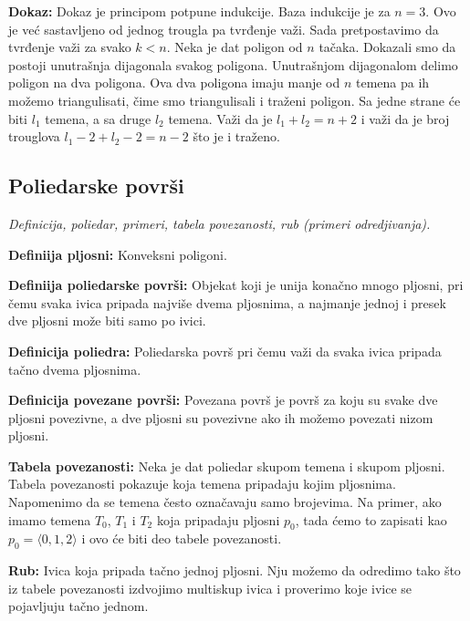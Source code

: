\documentclass[12pt]{article}
\begin{document}
\textbf{Dokaz:} Dokaz je principom potpune indukcije. Baza indukcije je za
$n=3$. Ovo je već sastavljeno od jednog trougla pa tvrđenje važi. Sada
pretpostavimo da tvrđenje važi za svako $k<n$. Neka je dat poligon od $n$
tačaka. Dokazali smo da postoji unutrašnja dijagonala svakog poligona.
Unutrašnjom dijagonalom delimo poligon na dva poligona. Ova dva poligona imaju
manje od $n$ temena pa ih možemo triangulisati, čime smo triangulisali i
traženi poligon. Sa jedne strane će biti $l_1$ temena, a sa druge $l_2$ temena.
Važi da je $l_1+l_2=n+2$ i važi da je broj trouglova $l_1-2+l_2-2=n-2$ što je
i traženo.

\subsection{Poliedarske površi}
\textit{Definicija, poliedar, primeri, tabela povezanosti, rub (primeri
    odredjivanja).}
\par
\vspace*{1cm}

\textbf{Definiija pljosni:} Konveksni poligoni.
\par

\textbf{Definiija poliedarske površi:} Objekat koji je unija konačno mnogo
pljosni, pri čemu svaka ivica pripada najviše dvema pljosnima, a najmanje
jednoj i presek dve pljosni može biti samo po ivici.
\par

\textbf{Definicija poliedra:} Poliedarska površ pri čemu važi da svaka ivica
pripada tačno dvema pljosnima.
\par

\textbf{Definicija povezane površi:} Povezana površ je površ za koju su svake
dve pljosni povezivne, a dve pljosni su povezivne ako ih možemo povezati nizom
pljosni.
\par

\textbf{Tabela povezanosti:} Neka je dat poliedar skupom temena i skupom
pljosni. Tabela povezanosti pokazuje koja temena pripadaju kojim pljosnima.
Napomenimo da se temena često označavaju samo brojevima. Na primer, ako imamo
temena $T_0$, $T_1$ i $T_2$ koja pripadaju pljosni $p_0$, tada ćemo to zapisati
kao $p_0=\langle0,1,2\rangle$ i ovo će biti deo tabele povezanosti.
\par

\textbf{Rub:} Ivica koja pripada tačno jednoj pljosni. Nju možemo da odredimo
tako što iz tabele povezanosti izdvojimo multiskup ivica i proverimo koje ivice
se pojavljuju tačno jednom.
\end{document}
